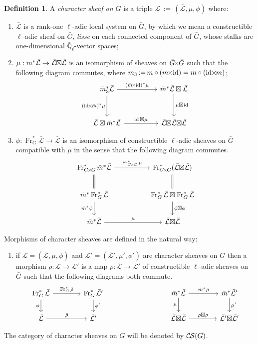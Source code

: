 \documentclass[10pt]{amsart}
\makeatletter
\theoremstyle{plain}
\theoremstyle{definition}
\newtheorem{definition}[theorem]{Definition}
\newcommand{\EE}{\mathbb{\bar Q}_\ell}
\newcommand{\Frob}[1]{\operatorname{Fr}_{#1}}
\DeclareMathOperator{\id}{id}
\newcommand{\ceq}{{\, :=\, }}
\newcommand{\cs}[1]{{\mathcal{#1}}}
\newcommand{\gcs}[1]{{\mathcal{\bar #1}}}
\newcommand{\CS}{{\mathcal{C\hskip-0.8pt S}}}
\newcommand{\labitem}[2]{
\def\@itemlabel{\textbf{#1}}
\item
\def\@currentlabel{#1}\label{#2}}
\newcommand{\bm}{\bar{m}}
\newcommand{\bG}{\bar{G}}
\newcommand{\brho}{{\bar\rho}}
\newcommand{\tight}[3]{\hspace{-#1pt}{#2}\hspace{-#3pt}}
\newcommand{\bGxG}{\text{$\bar{G} \tight{1}{\times}{1} \bar{G}$}}
\newcommand{\GxxG}{\text{$G \tight{1}{\times}{1} G$}}
\newcommand{\LxL}{\text{$\gcs{L} \tight{0}{\boxtimes}{0} \gcs{L}$}}
\makeatother
\begin{document}
\begin{definition}\label{def:CS}
A \emph{character sheaf on $G$} is a triple
$\cs{L}\ceq (\gcs{L},\mu,\phi)$ where:
\begin{enumerate}
\labitem{(CS.1)}{CS.1} $\gcs{L}$ is a rank-one $\ell$-adic local system on $\bG$, by which we mean a constructible
$\ell$-adic sheaf on $\bG$, {\it lisse} on each connected component of $\bG$, whose stalks are one-dimensional $\EE$-vector spaces;
\labitem{(CS.2)}{CS.2} $\mu: \bm^* \gcs{L} \to \LxL$ is an isomorphism of
sheaves on $\bGxG$ such that the following diagram commutes,
  where $m_3 \ceq m\circ (m\tight{1}{\times}{2}\id) = m\circ (\id\tight{2}{\times}{1} m)$;
  \[
  \begin{tikzcd}[row sep=30]
  \bm_3^*\gcs{L} \arrow{rr}{(\bm \tight{1}{\times}{2} \id)^*\mu} \arrow[swap]{d}{(\id \tight{2}{\times}{1} \bm)^*\mu}
    &&  \bm^*\gcs{L} \boxtimes \gcs{L} \dar{\mu \tight{0}{\boxtimes}{1} \id} \\
    \gcs{L} \boxtimes \bm^* \gcs{L} \arrow{rr}{\id \boxtimes \mu}
    &&  \gcs{L} \tight{0}{\boxtimes}{0} \LxL
  \end{tikzcd}
  \]
\labitem{(CS.3)}{CS.3} $\phi : \Frob{G}^* \gcs{L} \to \gcs{L}$ is an
  isomorphism of constructible $\ell$-adic sheaves on $\bG$ compatible with
  $\mu$ in the sense that the following diagram commutes.
  \[
  \begin{tikzcd}[row sep=20]
  \Frob{\GxxG}^* \bm^* \gcs{L} \arrow{rr}{\Frob{\GxxG}^*\mu}
    && \Frob{\GxxG}^*(\LxL)\\
    \arrow[equal]{u} \bm^*  \Frob{G}^* \gcs{L} \arrow[swap]{d}{\bm^* \phi}
    && \Frob{G}^*\gcs{L}\boxtimes \Frob{G}^*\gcs{L} \dar{\phi\boxtimes \phi} \arrow[equal]{u} \\
    \bm^*\gcs{L} \arrow{rr}{\mu}
    && \LxL
  \end{tikzcd}
  \]
\end{enumerate}
Morphisms of character sheaves are defined in the natural way:
\begin{enumerate}
\labitem{(CS.4)}{CS.4} if $\cs{L} = (\gcs{L},\mu,\phi)$ and
  $\cs{L'} = (\gcs{L'},\mu',\phi')$ are character sheaves on $G$ then
  a morphism $\rho : \cs{L} \to \cs{L}'$ is a map $\brho : \gcs{L} \to \gcs{L'}$
  of constructible $\ell$-adic sheaves on $\bG$ such that the following diagrams both commute.
  \[
  \begin{tikzcd}[column sep=40]
  \Frob{G}^* \gcs{L} \rar{\Frob{G}^* \brho} \arrow[swap]{d}{\phi} & \Frob{G}^* \gcs{L'} \dar{\phi'}
  & & \arrow[swap]{d}{\mu} \bm^* \gcs{L} \rar{\bm^* \brho} & \bm^* \gcs{L'} \dar{\mu'} \\
  \gcs{L} \rar{\brho} & \gcs{L'}
  & {} & \LxL \rar{\tight{1}{\rho\boxtimes \rho}{1}} & \gcs{L'} \tight{0}{\boxtimes}{0} \gcs{L'}
  \end{tikzcd}
  \]
\end{enumerate}
 The category of character sheaves on $G$ will be denoted by $\CS(G)$.
 \end{definition}
\end{document}
